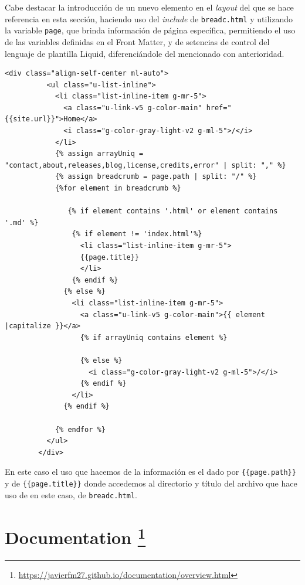 Cabe destacar la introducción de un nuevo elemento en el \textit{layout} del que se hace referencia en esta sección, haciendo uso del \textit{include} de \texttt{breadc.html} y utilizando la variable \texttt{page}, que brinda información de página específica, permitiendo el uso de las variables definidas en el Front Matter, y de setencias de control del lenguaje de plantilla Liquid,  diferenciándole del mencionado con anterioridad. 

\begin{lstlisting}[style=htmlcssjs,caption=Breadcrumber,label={code:breadcrum}]
  <div class="align-self-center ml-auto">
          <ul class="u-list-inline">
            <li class="list-inline-item g-mr-5">
              <a class="u-link-v5 g-color-main" href="{{site.url}}">Home</a>
              <i class="g-color-gray-light-v2 g-ml-5">/</i>
            </li>
            {% assign arrayUniq = "contact,about,releases,blog,license,credits,error" | split: "," %}
            {% assign breadcrumb = page.path | split: "/" %}
            {%for element in breadcrumb %}

               {% if element contains '.html' or element contains '.md' %}
                {% if element != 'index.html'%}
                  <li class="list-inline-item g-mr-5">
                  {{page.title}}
                  </li>
                {% endif %}
              {% else %}
                <li class="list-inline-item g-mr-5">
                  <a class="u-link-v5 g-color-main">{{ element |capitalize }}</a>
                  {% if arrayUniq contains element %}

                  {% else %}
                    <i class="g-color-gray-light-v2 g-ml-5">/</i>
                  {% endif %}
                </li>
              {% endif %}

            {% endfor %}
          </ul>
        </div>
\end{lstlisting}

En este caso el uso que hacemos de la información es el dado por \texttt{\{\{page.path\}\}} y de \texttt{\{\{page.title\}\}} donde accedemos al directorio y título del archivo que hace uso de en este caso, de \texttt{breadc.html}.

\section[Documentation]{Documentation \footnote{\url{https://javierfm27.github.io/documentation/overview.html}}}
\label{sec:docWeb}

